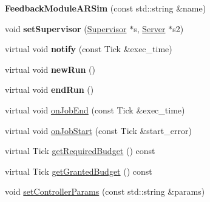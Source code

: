 \begin{DoxyCompactItemize}
\item 
{\bfseries Feedback\+Module\+A\+R\+Sim} (const std\+::string \&name)\hypertarget{classRTSim_1_1FeedbackModuleARSim_addbb897565c06c27c065cac660aeea81}{}\label{classRTSim_1_1FeedbackModuleARSim_addbb897565c06c27c065cac660aeea81}

\item 
void {\bfseries set\+Supervisor} (\hyperlink{classRTSim_1_1Supervisor}{Supervisor} $\ast$s, \hyperlink{classRTSim_1_1Server}{Server} $\ast$s2)\hypertarget{classRTSim_1_1FeedbackModuleARSim_a9bd83844dcbf4bf969e5e377dabced8e}{}\label{classRTSim_1_1FeedbackModuleARSim_a9bd83844dcbf4bf969e5e377dabced8e}

\item 
virtual void {\bfseries notify} (const Tick \&exec\+\_\+time)\hypertarget{classRTSim_1_1FeedbackModuleARSim_aa037895127cb7d9563e0dc5e80d657dd}{}\label{classRTSim_1_1FeedbackModuleARSim_aa037895127cb7d9563e0dc5e80d657dd}

\item 
virtual void {\bfseries new\+Run} ()\hypertarget{classRTSim_1_1FeedbackModuleARSim_ac133c0196305d717b5f285afd6e8008b}{}\label{classRTSim_1_1FeedbackModuleARSim_ac133c0196305d717b5f285afd6e8008b}

\item 
virtual void {\bfseries end\+Run} ()\hypertarget{classRTSim_1_1FeedbackModuleARSim_af420dac6f7f5e30ef58ff93078e64e13}{}\label{classRTSim_1_1FeedbackModuleARSim_af420dac6f7f5e30ef58ff93078e64e13}

\item 
virtual void \hyperlink{classRTSim_1_1FeedbackModuleARSim_a0031695275b4a2bbae9dcfb2a53866bb}{on\+Job\+End} (const Tick \&exec\+\_\+time)
\item 
virtual void \hyperlink{classRTSim_1_1FeedbackModuleARSim_ab2e4b6a69026b02a50becdd13334ad20}{on\+Job\+Start} (const Tick \&start\+\_\+error)
\item 
virtual Tick \hyperlink{classRTSim_1_1FeedbackModuleARSim_ae2e0a8a2c4086466c557e0f130ddb35c}{get\+Required\+Budget} () const 
\item 
virtual Tick \hyperlink{classRTSim_1_1FeedbackModuleARSim_ace0189ef49470072e20d38a74dad2c1d}{get\+Granted\+Budget} () const 
\item 
void \hyperlink{classRTSim_1_1FeedbackModuleARSim_a6c13b71ce001294aa2c98c018a88a0fd}{set\+Controller\+Params} (const std\+::string \&params)
\end{DoxyCompactItemize}
